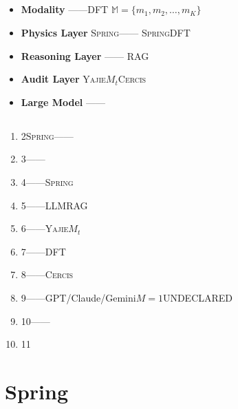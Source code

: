\documentclass[12pt,a4paper]{article}
\theoremstyle{remark}
\newcommand{\Spring}{\textsc{Spring}}
\newcommand{\Yajie}{\textsc{Yajie}}
\newcommand{\Cercis}{\textsc{Cercis}}
\newcommand{\ModalitySet}{\ensuremath{\mathbb{M}}}
\begin{document}
\subsection{}



\begin{itemize}[nosep]
    \item \textbf{Modality} ——DFT
    $\ModalitySet = \{m_1, m_2, \ldots, m_K\}$
    \item \textbf{Physics Layer} \Spring{}——
    \Spring{}DFT
    \item \textbf{Reasoning Layer} ——
    RAG
    \item \textbf{Audit Layer} \Yajie{}$M_t$\Cercis{}
    \item \textbf{Large Model} ——
    
\end{itemize}

\subsection{}

\begin{enumerate}[label=(\arabic*),itemsep=3pt]
    \item 2\Spring{}——
    \item 3——
    \item 4——\Spring{}
    \item 5——LLMRAG
    \item 6——\Yajie{}$M_t$
    \item 7——DFT
    \item 8——\Cercis{}
    \item 9——GPT/Claude/Gemini$M=1$UNDECLARED
    \item 10——
    \item 11
\end{enumerate}

\newpage

\section{Spring}

\subsection{}
\end{document}
